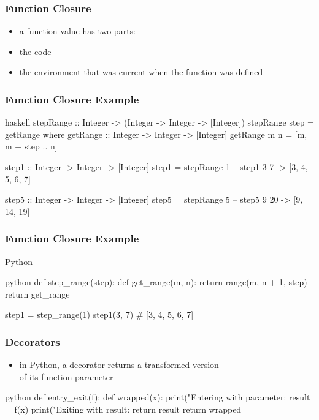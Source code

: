 \documentclass[dvipsnames]{beamer}
\theoremstyle{plain}
\begin{document}
\begin{frame}[fragile]
  \frametitle{Function Closure}

  \begin{itemize}
    \item a function value has two parts:

    \medskip
    \item the code
    \item the environment that was current when the function was defined
  \end{itemize}
\end{frame}

\begin{frame}[fragile]
  \frametitle{Function Closure Example}

  \begin{exampleblock}{}
    \begin{pygments}{haskell}
stepRange :: Integer ->
                (Integer -> Integer -> [Integer])
stepRange step = getRange
  where
    getRange :: Integer -> Integer -> [Integer]
    getRange m n = [m, m + step .. n]

step1 :: Integer -> Integer -> [Integer]
step1 = stepRange 1
-- step1 3 7 -> [3, 4, 5, 6, 7]

step5 :: Integer -> Integer -> [Integer]
step5 = stepRange 5
-- step5 9 20 -> [9, 14, 19]
    \end{pygments}
  \end{exampleblock}
\end{frame}

\begin{frame}[fragile]
  \frametitle{Function Closure Example}

  \begin{exampleblock}{Python}
    \begin{pygments}{python}
def step_range(step):
    def get_range(m, n):
        return range(m, n + 1, step)
    return get_range

step1 = step_range(1)
step1(3, 7)            # [3, 4, 5, 6, 7]
    \end{pygments}
  \end{exampleblock}
\end{frame}

\begin{frame}[fragile]
  \frametitle{Decorators}

  \begin{itemize}
    \item in Python, a decorator returns a transformed version\\
      of its function parameter
  \end{itemize}

  \begin{exampleblock}{}
    \begin{pygments}{python}
def entry_exit(f):
    def wrapped(x):
        print("Entering with parameter: %
        result = f(x)
        print("Exiting with result: %
        return result
    return wrapped
    \end{pygments}
  \end{exampleblock}
\end{frame}
\end{document}
